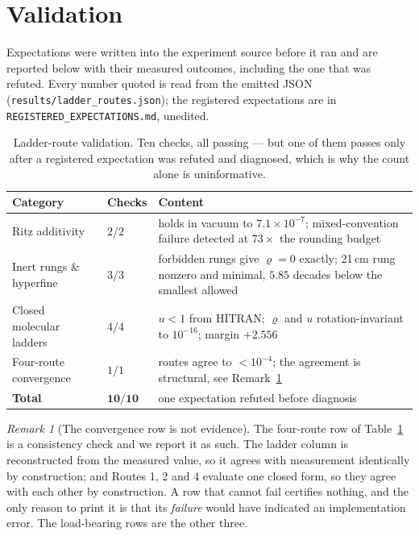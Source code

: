 \documentclass[11pt,a4paper]{article}
\theoremstyle{stmtstyle}
\theoremstyle{definition}
\theoremstyle{remark}
\newtheorem*{remark}{Remark}
\newcommand{\circu}{\varrho}
\newcommand{\unif}{u}
\begin{document}
\section{Validation}
\label{sec:validation}

Expectations were written into the experiment source before it ran and are
reported below with their measured outcomes, including the one that was
refuted. Every number quoted is read from the emitted JSON
(\texttt{results/ladder\_routes.json}); the registered expectations are in
\texttt{REGISTERED\_EXPECTATIONS.md}, unedited.

\begin{table}[H]
\centering\small
\caption{Ladder-route validation. Ten checks, all passing --- but one of
them passes only after a registered expectation was refuted and diagnosed,
which is why the count alone is uninformative.}
\label{tab:validation}
\begin{tabular}{llp{6.6cm}}
\toprule
\textbf{Category} & \textbf{Checks} & \textbf{Content}\\
\midrule
Ritz additivity & $2/2$ &
holds in vacuum to $7.1\times10^{-7}$; mixed-convention failure detected at
$73\times$ the rounding budget\\
Inert rungs \& hyperfine & $3/3$ &
forbidden rungs give $\circu=0$ exactly; 21\,cm rung nonzero and minimal,
$5.85$ decades below the smallest allowed\\
Closed molecular ladders & $4/4$ &
$\unif<1$ from HITRAN; $\circu$ and $\unif$ rotation-invariant to
$10^{-16}$; margin $+2.556$\\
Four-route convergence & $1/1$ &
routes agree to $<10^{-4}$; the agreement is structural, see
Remark~\ref{rem:structural}\\
\midrule
\textbf{Total} & $\mathbf{10/10}$ & one expectation refuted before diagnosis\\
\bottomrule
\end{tabular}
\end{table}

\begin{remark}[The convergence row is not evidence]
\label{rem:structural}
The four-route row of Table~\ref{tab:validation} is a consistency check and
we report it as such. The ladder column is reconstructed from the measured
value, so it agrees with measurement identically by construction; and
Routes 1, 2 and 4 evaluate one closed form, so they agree with each other
by construction. A row that cannot fail certifies nothing, and the only
reason to print it is that its \emph{failure} would have indicated an
implementation error. The load-bearing rows are the other three.
\end{remark}
\end{document}
